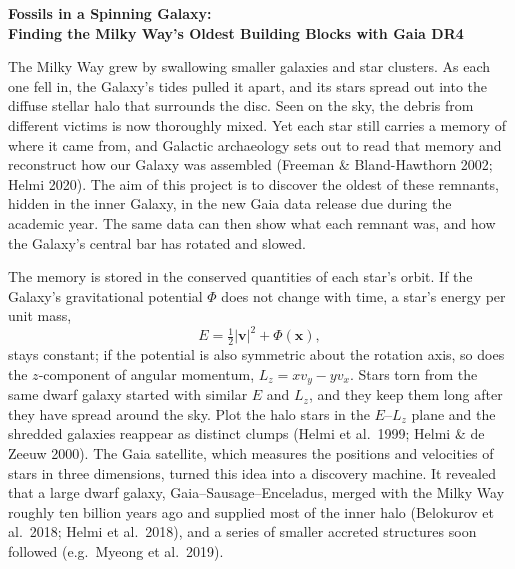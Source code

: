 \documentclass[11pt,a4paper]{article}
\begin{document}
\begin{center}
{\LARGE\bfseries Fossils in a Spinning Galaxy:\\[0.3em] Finding the Milky Way's Oldest Building Blocks with Gaia DR4}
\end{center}
\vspace{0.5em}

The Milky Way grew by swallowing smaller galaxies and star clusters. As each one fell in, the Galaxy's tides pulled it apart, and its stars spread out into the diffuse stellar halo that surrounds the disc. Seen on the sky, the debris from different victims is now thoroughly mixed. Yet each star still carries a memory of where it came from, and Galactic archaeology sets out to read that memory and reconstruct how our Galaxy was assembled (Freeman \& Bland-Hawthorn 2002; Helmi 2020). The aim of this project is to discover the oldest of these remnants, hidden in the inner Galaxy, in the new Gaia data release due during the academic year. The same data can then show what each remnant was, and how the Galaxy's central bar has rotated and slowed.

The memory is stored in the conserved quantities of each star's orbit. If the Galaxy's gravitational potential $\Phi$ does not change with time, a star's energy per unit mass,
\begin{equation}
E = \tfrac{1}{2}|\mathbf{v}|^2 + \Phi(\mathbf{x}),
\end{equation}
stays constant; if the potential is also symmetric about the rotation axis, so does the $z$-component of angular momentum, $L_z = x v_y - y v_x$. Stars torn from the same dwarf galaxy started with similar $E$ and $L_z$, and they keep them long after they have spread around the sky. Plot the halo stars in the $E$--$L_z$ plane and the shredded galaxies reappear as distinct clumps (Helmi et al.\ 1999; Helmi \& de Zeeuw 2000). The Gaia satellite, which measures the positions and velocities of stars in three dimensions, turned this idea into a discovery machine. It revealed that a large dwarf galaxy, Gaia--Sausage--Enceladus, merged with the Milky Way roughly ten billion years ago and supplied most of the inner halo (Belokurov et al.\ 2018; Helmi et al.\ 2018), and a series of smaller accreted structures soon followed (e.g.\ Myeong et al.\ 2019).
\end{document}
